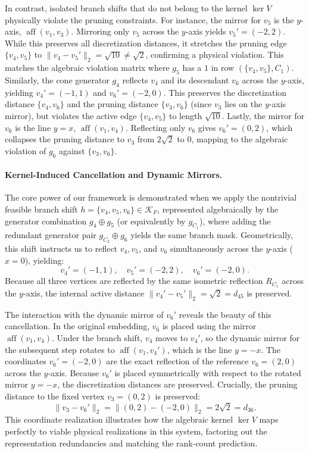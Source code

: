 In contrast, isolated branch shifts that do not belong to the kernel $\ker V$ physically violate the pruning constraints. For instance, the mirror for $v_5$ is the $y$-axis, $\operatorname{aff}(v_1, v_3)$. Mirroring only $v_5$ across the $y$-axis yields $v_5' = (-2, 2)$. While this preserves all discretization distances, it stretches the pruning edge $\{v_4, v_5\}$ to $\|v_4 - v_5'\|_2 = \sqrt{10} \ne \sqrt{2}$, confirming a physical violation. This matches the algebraic violation matrix where $g_5$ has a $1$ in row $(\{v_4,v_5\}, C_1)$. Similarly, the cone generator $g_4$ reflects $v_4$ and its descendant $v_6$ across the $y$-axis, yielding $v_4' = (-1,1)$ and $v_6' = (-2,0)$. This preserves the discretization distance $\{v_4, v_6\}$ and the pruning distance $\{v_3, v_6\}$ (since $v_3$ lies on the $y$-axis mirror), but violates the active edge $\{v_4, v_5\}$ to length $\sqrt{10}$. Lastly, the mirror for $v_6$ is the line $y=x$, $\operatorname{aff}(v_1, v_4)$. Reflecting only $v_6$ gives $v_6' = (0,2)$, which collapses the pruning distance to $v_3$ from $2\sqrt{2}$ to $0$, mapping to the algebraic violation of $g_6$ against $\{v_3,v_6\}$.

\paragraph{Kernel-Induced Cancellation and Dynamic Mirrors.}
The core power of our framework is demonstrated when we apply the nontrivial feasible branch shift $h = \{v_4, v_5, v_6\} \in \mathcal{K}_F$, represented algebraically by the generator combination $g_4 \oplus g_5$ (or equivalently by $g_{C_1}$), where adding the redundant generator pair $g_{C_2} \oplus g_6$ yields the same branch mask. Geometrically, this shift instructs us to reflect $v_4, v_5$, and $v_6$ simultaneously across the $y$-axis ($x=0$), yielding:
\[
v_4' = (-1, 1), \quad v_5' = (-2, 2), \quad v_6' = (-2, 0).
\]
Because all three vertices are reflected by the same isometric reflection $R_{C_1}$ across the $y$-axis, the internal active distance $\|v_4' - v_5'\|_2 = \sqrt{2} = d_{45}$ is preserved. 

The interaction with the dynamic mirror of $v_6'$ reveals the beauty of this cancellation. In the original embedding, $v_6$ is placed using the mirror $\operatorname{aff}(v_1, v_4)$. Under the branch shift, $v_4$ moves to $v_4'$, so the dynamic mirror for the subsequent step rotates to $\operatorname{aff}(v_1, v_4')$, which is the line $y = -x$. The coordinates $v_6' = (-2,0)$ are the exact reflection of the reference $v_6 = (2,0)$ across the $y$-axis. Because $v_6'$ is placed symmetrically with respect to the rotated mirror $y = -x$, the discretization distances are preserved. Crucially, the pruning distance to the fixed vertex $v_3 = (0,2)$ is preserved:
\[
\|v_3 - v_6'\|_2 = \|(0,2) - (-2,0)\|_2 = 2\sqrt{2} = d_{36}.
\]
This coordinate realization illustrates how the algebraic kernel $\ker V$ maps perfectly to viable physical realizations in this system, factoring out the representation redundancies and matching the rank-count prediction.

